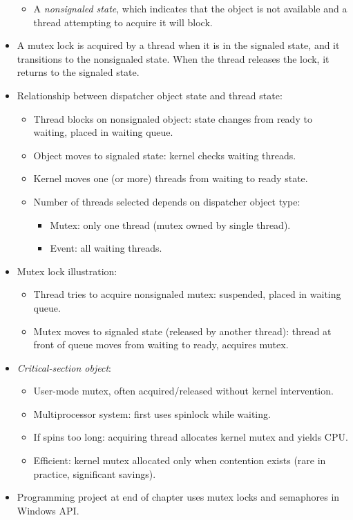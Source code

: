 \begin{itemize}
\begin{itemize}
        \item A \textit{nonsignaled state}, which indicates that the object is not available and a thread attempting to acquire it will block.
    \end{itemize}
    \item A mutex lock is acquired by a thread when it is in the signaled state, and it transitions to the nonsignaled state. When the thread releases the lock, it returns to the signaled state.
    \item Relationship between dispatcher object state and thread state:
    \begin{itemize}
        \item Thread blocks on nonsignaled object: state changes from ready to waiting, placed in waiting queue.
        \item Object moves to signaled state: kernel checks waiting threads.
        \item Kernel moves one (or more) threads from waiting to ready state.
        \item Number of threads selected depends on dispatcher object type:
        \begin{itemize}
            \item Mutex: only one thread (mutex owned by single thread).
            \item Event: all waiting threads.
        \end{itemize}
    \end{itemize}
    \item Mutex lock illustration:
    \begin{itemize}
        \item Thread tries to acquire nonsignaled mutex: suspended, placed in waiting queue.
        \item Mutex moves to signaled state (released by another thread): thread at front of queue moves from waiting to ready, acquires mutex.
    \end{itemize}
    \item \textit{Critical-section object}:
    \begin{itemize}
        \item User-mode mutex, often acquired/released without kernel intervention.
        \item Multiprocessor system: first uses spinlock while waiting.
        \item If spins too long: acquiring thread allocates kernel mutex and yields CPU.
        \item Efficient: kernel mutex allocated only when contention exists (rare in practice, significant savings).
    \end{itemize}
    \item Programming project at end of chapter uses mutex locks and semaphores in Windows API.
\end{itemize}

